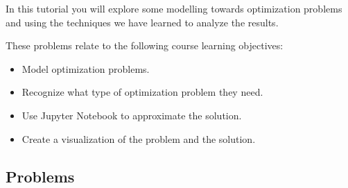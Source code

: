 		\begin{objectives}
			In this tutorial you will explore some modelling towards optimization problems and using the techniques we have learned to analyze the results.

				These problems relate to the following course learning objectives:
				\begin{itemize}\it 
					\item Model optimization problems. \\[-20pt]
					\item Recognize what type of optimization problem they need. \\[-20pt]
					\item Use Jupyter Notebook to approximate the solution. \\[-20pt]
					\item Create a visualization of the problem and the solution.
				\end{itemize}
		\end{objectives}

\vspace{-.5em}
\subsection*{Problems}
\vspace{-.5em}


